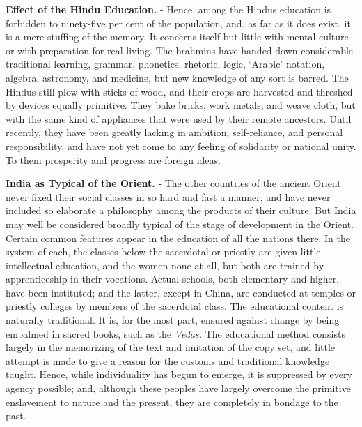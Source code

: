 \documentclass[]{book}
\begin{document}
\textbf{Effect of the Hindu Education.} - Hence, among the Hindus education is forbidden to ninety-five per cent of the population, and, as far as it does exist, it is a mere stuffing of the memory. It concerns itself but little with mental culture or with preparation for real living. The brahmins have handed down considerable traditional learning, grammar, phonetics, rhetoric, logic, `Arabic' notation, algebra, astronomy, and medicine, but new knowledge of any sort is barred. The Hindus still plow with sticks of wood, and their crops are harvested and threshed by devices equally primitive. They bake bricks, work metals, and weave cloth, but with the same kind of appliances that were used by their remote ancestors. Until recently, they have been greatly lacking in ambition, self-reliance, and personal responsibility, and have not yet come to any feeling of solidarity or national unity. To them prosperity and progress are foreign ideas.

\textbf{India as Typical of the Orient.} - The other countries of the ancient Orient never fixed their social classes in so hard and fast a manner, and have never included so elaborate a philosophy among the products of their culture. But India may well be considered broadly typical of the stage of development in the Orient. Certain common features appear in the education of all the nations there. In the system of each, the classes below the sacerdotal or priestly are given little intellectual education, and the women none at all, but both are trained by apprenticeship in their vocations. Actual schools, both elementary and higher, have been instituted; and the latter, except in China, are conducted at temples or priestly colleges by members of the sacerdotal class. The educational content is naturally traditional. It is, for the most part, ensured against change by being embalmed in sacred books, such as the \emph{Vedas.} The educational method consists largely in the memorizing of the text and imitation of the copy set, and little attempt is made to give a reason for the customs and traditional knowledge taught. Hence, while individuality has begun to emerge, it is suppressed by every agency possible; and, although these peoples have largely overcome the primitive enslavement to nature and the present, they are completely in bondage to the past.
\end{document}
